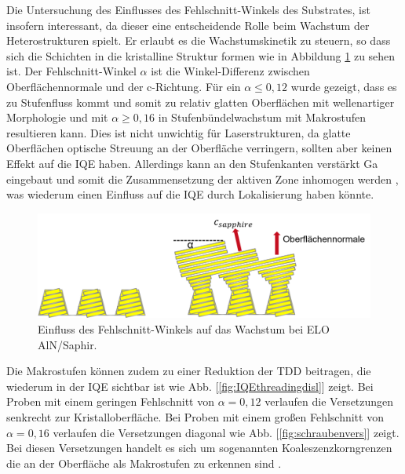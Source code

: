 Die Untersuchung des Einflusses des Fehlschnitt-Winkels des Substrates, ist insofern interessant, da dieser eine entscheidende Rolle beim Wachstum der Heterostrukturen spielt. Er erlaubt es die Wachstumskinetik zu steuern, so dass sich die Schichten in die kristalline Struktur  formen wie in Abbildung \ref{fig:offcut} zu sehen ist.
Der Fehlschnitt-Winkel $\alpha$ ist die Winkel-Differenz zwischen Oberflächennormale und der c-Richtung. Für ein $\alpha \leq 0,12 $ wurde gezeigt, dass es zu Stufenfluss kommt und somit zu relativ glatten Oberflächen mit wellenartiger Morphologie und mit $\alpha \geq 0,16 $ in Stufenbündelwachstum mit Makrostufen resultieren kann. Dies ist nicht unwichtig für Laserstrukturen, da glatte Oberflächen optische Streuung an der Oberfläche verringern, sollten aber keinen Effekt auf die IQE haben. Allerdings kann an den Stufenkanten verstärkt Ga eingebaut und somit die Zusammensetzung der aktiven Zone inhomogen werden \cite{zeimeru} \cite{MOGILATENKO2014222} \cite{fmehnke}, was wiederum einen Einfluss auf die IQE durch Lokalisierung haben könnte.
%
\begin{figure}[htb]
\includegraphics[width=\linewidth]{Bilder/offcut.png}
\caption{Einfluss des Fehlschnitt-Winkels auf das Wachstum bei ELO AlN/Saphir.}
\label{fig:offcut}
\end{figure}
\noindent 
%
Die Makrostufen können zudem zu einer Reduktion der TDD beitragen, die wiederum in der IQE sichtbar ist wie Abb. [\ref{fig:IQEthreadingdisl}] zeigt. Bei Proben mit einem geringen Fehlschnitt von $\alpha = 0,12 $ verlaufen die Versetzungen senkrecht zur Kristalloberfläche. Bei Proben mit einem großen Fehlschnitt von $\alpha = 0,16 $ verlaufen die Versetzungen diagonal wie Abb. [\ref{fig:schraubenvers}] zeigt. Bei diesen Versetzungen handelt es sich um sogenannten Koaleszenzkorngrenzen die an der Oberfläche als Makrostufen zu erkennen sind \cite{MOGILATENKO2014222}. 
%
